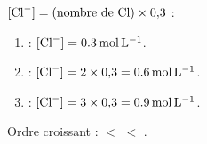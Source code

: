 \documentclass[11pt,a4paper]{article}
\begin{document}
\begin{corrige}
$[\ce{Cl-}] = \text{(nombre de \ce{Cl})}\times 0{,}3$ :
\begin{enumerate}[label=\alph*)]
  \item {} : $[\ce{Cl-}] = \SI{0.3}{\mole\per\litre}$.
  \item {} : $[\ce{Cl-}] = 2\times 0{,}3 = \SI{0.6}{\mole\per\litre}$.
  \item {} : $[\ce{Cl-}] = 3\times 0{,}3 = \SI{0.9}{\mole\per\litre}$.
\end{enumerate}
Ordre croissant :  $<$  $<$ .
\end{corrige}
\end{document}

